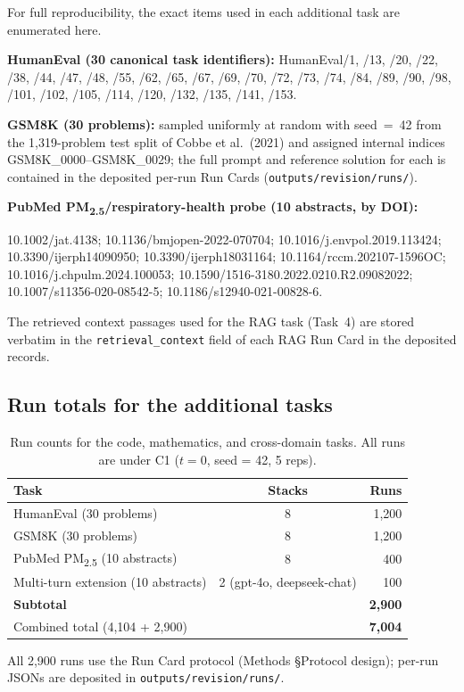\documentclass[11pt]{article}
\begin{document}
For full reproducibility, the exact items used in each additional task are enumerated here.

\textbf{HumanEval (30 canonical task identifiers):}
HumanEval/1, /13, /20, /22, /38, /44, /47, /48, /55, /62, /65, /67, /69, /70, /72, /73, /74, /84, /89, /90, /98, /101, /102, /105, /114, /120, /132, /135, /141, /153.

\textbf{GSM8K (30 problems):} sampled uniformly at random with seed~=~42 from the 1{,}319-problem test split of Cobbe et al.\ (2021) and assigned internal indices GSM8K\_0000--GSM8K\_0029; the full prompt and reference solution for each is contained in the deposited per-run Run Cards (\texttt{outputs/revision/runs/}).

\textbf{PubMed PM\textsubscript{2.5}/respiratory-health probe (10 abstracts, by DOI):}
{\raggedright
10.1002/jat.4138; 10.1136/bmjopen-2022-070704; 10.1016/j.envpol.2019.113424; 10.3390/ijerph14090950; 10.3390/ijerph18031164; 10.1164/rccm.202107-1596OC; 10.1016/j.chpulm.2024.100053; 10.1590/1516-3180.2022.0210.R2.09082022; 10.1007/s11356-020-08542-5; 10.1186/s12940-021-00828-6.\par}

The retrieved context passages used for the RAG task (Task~4) are stored verbatim in the \texttt{retrieval\_context} field of each RAG Run Card in the deposited records.

\subsection{Run totals for the additional tasks}

\begin{table}[H]
\centering
\caption{Run counts for the code, mathematics, and cross-domain tasks. All runs are under C1 ($t = 0$, seed = 42, 5 reps).}
\label{tab:revision-runs}
\small
\begin{tabular}{@{}lcr@{}}
\toprule
\textbf{Task} & \textbf{Stacks} & \textbf{Runs} \\
\midrule
HumanEval (30 problems)       & 8 & 1{,}200 \\
GSM8K (30 problems)           & 8 & 1{,}200 \\
PubMed PM\textsubscript{2.5} (10 abstracts) & 8 & 400 \\
Multi-turn extension (10 abstracts) & 2 (gpt-4o, deepseek-chat) & 100 \\
\midrule
\textbf{Subtotal}             &   & \textbf{2{,}900} \\
\midrule
Combined total (4{,}104 + 2{,}900) & & \textbf{7{,}004} \\
\bottomrule
\end{tabular}
\par\smallskip\raggedright\footnotesize
All 2{,}900 runs use the Run Card protocol (Methods §Protocol design); per-run JSONs are deposited in \texttt{outputs/revision/runs/}.
\end{table}
\end{document}
